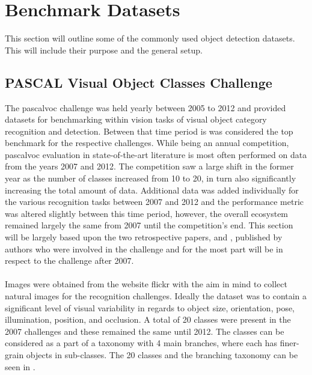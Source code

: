 \section{Benchmark Datasets}
This section will outline some of the commonly used object detection datasets. This will include their purpose and the general setup.


\subsection{PASCAL Visual Object Classes Challenge}
The \gls{pascalvoc} challenge \cite{pascalvoc2012} was held yearly between 2005 to 2012 and provided datasets for benchmarking within vision tasks of visual object category recognition and detection. Between that time period is was considered the top benchmark for the respective challenges. While being an annual competition, \gls{pascalvoc} evaluation in state-of-the-art literature is most often performed on data from the years 2007 and 2012. The competition saw a large shift in the former year as the number of classes increased from 10 to 20, in turn also significantly increasing the total amount of data. Additional data was added individually for the various recognition tasks between 2007 and 2012 and the performance metric was altered slightly between this time period, however, the overall ecosystem remained largely the same from 2007 until the competition's end. This section will be largely based upon the two retrospective papers, \cite{pascalvoc2010} and \cite{pascalvoc2015}, published by authors who were involved in the challenge and for the most part will be in respect to the challenge after 2007.
\\\\
Images were obtained from the website flickr \cite{flickr} with the aim in mind to collect natural images for the recognition challenges. Ideally the dataset was to contain a significant level of visual variability in regards to object size, orientation, pose, illumination, position, and occlusion. A total of 20 classes were present in the 2007 challenges and these remained the same until 2012. The classes can be considered as a part of a taxonomy with 4 main branches, where each has finer-grain objects in sub-classes. The 20 classes and the branching taxonomy can be seen in .


